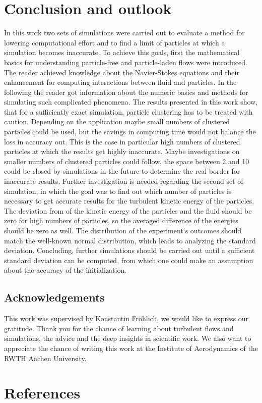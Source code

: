 \documentclass[11pt,a4paper,openany,oneside,parskip=half*]{article}
\begin{document}
\section{Conclusion and outlook}
In this work two sets of simulations were carried out to evaluate a method for lowering computational effort and to find a limit of particles at which a simulation becomes inaccurate. 
\newline
To achieve this goals, first the mathematical basics for understanding particle-free and particle-laden flows were introduced. The reader achieved knowledge about the Navier-Stokes equations and their enhancement for computing interactions between fluid and particles. In the following the reader got information about the numeric basics and methods for simulating such complicated phenomena. 
\newline
The results presented in this work show, that for a sufficiently exact simulation, particle clustering has to be treated with caution. Depending on the application maybe small numbers of clustered particles could be used, but the savings in computing time would not balance the loss in accuracy out. This is the case in particular high numbers of clustered particles at which the results get highly inaccurate. Maybe investigations on smaller numbers of clustered particles could follow, the space between 2 and 10 could be closed by simulations in the future to determine the real border for inaccurate results. 
\newline
Further investigation is needed regarding the second set of simulation, in which the goal was to find out which number of particles is necessary to get accurate results for the turbulent kinetic energy of the particles. The deviation from of the kinetic energy of the particles and the fluid should be zero for high numbers of particles, so the averaged difference of the energies should be zero as well. The distribution of the experiment`s outcomes should match the well-known normal distribution, which leads to analyzing the standard deviation. Concluding, further simulations should be carried out until a sufficient standard deviation can be computed, from which one could make an assumption about the accuracy of the initialization.
\subsection*{Acknowledgements}
This work was supervised by Konstantin Fr\"ohlich, we would like to express our gratitude. Thank you for the chance of learning about turbulent flows and simulations, the advice and the deep insights in scientific work. We also want to appreciate the chance of writing this work at the Institute of Aerodynamics of the RWTH Aachen University.
\pagebreak
\section{References}
\nocite{*} %
\pagebreak
\end{document}

